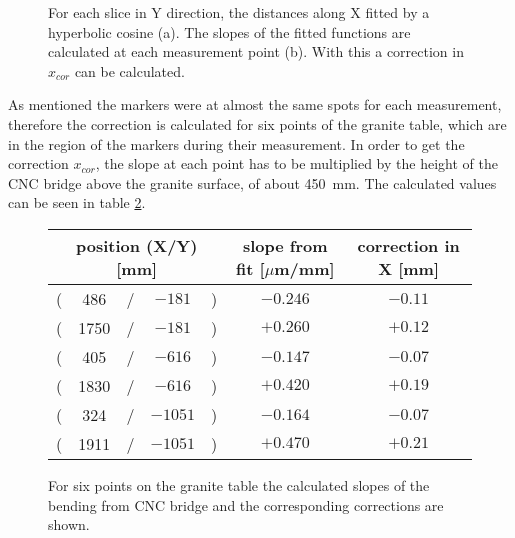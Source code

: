 \documentclass[
a4paper,                                %
twoside,                                %
BCOR1.4cm,                      %
10pt,                           %
headings=normal,                %
headsepline,                    %
clearplainpage, %
final,                                  %
div=14,
parskip=full,
openright,
bibliography=toc
]{scrreprt}
\begin{document}
\begin{figure}[H]	
	\centering
	\qquad
	\caption{For each slice in Y direction, the distances along X fitted by a hyperbolic cosine (a). The slopes of the fitted functions are calculated at each measurement point (b). With this a correction in $x_{cor}$ can be calculated.}
	\label{xCorrScheme}
\end{figure}

As mentioned the markers were at almost the same spots for each measurement, therefore the correction is calculated for six points of the granite table, which are in the region of the markers during their measurement. In order to get the correction $x_{cor}$, the slope at each point has to be multiplied by the height of the CNC bridge above the granite surface, of about \SI{450}{\mm}. The calculated values can be seen in table \ref{xCorrTable}.

\begin{figure}[H]
	\centering
	\begin{tabular}{ccccc|cc} 
		\multicolumn{5}{c}{position (X/Y)[mm]} & slope from fit [$\mu$m/mm] & correction in X [mm] 
		\\
		\hline
		( & 486 & / & $-181$ & ) & $-0.246$ & $-0.11$
		\\
		( & 1750 & / & $-181$ & ) & $+0.260$ & $+0.12$
		\\
		\hline
		( & 405 & / & $-616$ & ) & $-0.147$ & $-0.07$
		\\
		( & 1830 & / & $-616$ & ) & $+0.420$ & $+0.19$
		\\
		\hline
		( & 324 & / & $-1051$ & ) & $-0.164$ & $-0.07$
		\\
		( & 1911 & / & $-1051$ & ) & $+0.470$ & $+0.21$
	\end{tabular}
	\caption{For six points on the granite table the calculated slopes of the bending from CNC bridge and the corresponding corrections are shown.}
	\label{xCorrTable}
\end{figure}
\end{document}

